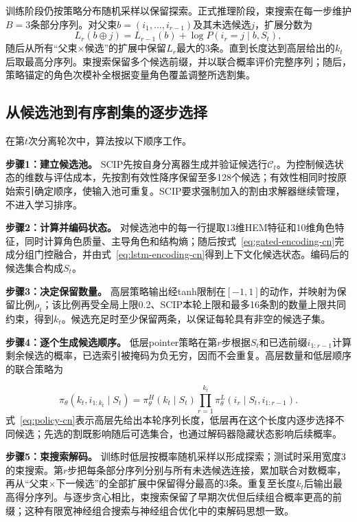 \documentclass[final,5p,times,twocolumn]{elsarticle}
\begin{document}
训练阶段仍按策略分布随机采样以保留探索。正式推理阶段，束搜索在每一步维护$B=3$条部分序列。对父束$b=(i_1,\ldots,i_{r-1})$及其未选候选$j$，扩展分数为
\begin{equation}
L_r(b\oplus j)=L_{r-1}(b)+\log P(i_r=j\mid b,S_t),
\label{eq:beam-score-cn}
\end{equation}
随后从所有“父束$\times$候选”的扩展中保留$L_r$最大的3条。直到长度达到高层给出的$k_t$后取最高分序列。束搜索保留多个候选前缀，并以联合概率评价完整序列；随后，策略锚定的角色次模补全根据变量角色覆盖调整所选割集。

\subsection{从候选池到有序割集的逐步选择}

在第$t$次分离轮次中，算法按以下顺序工作。

\noindent\textbf{步骤1：建立候选池。} SCIP先按自身分离器生成并验证候选行$\mathcal C_t$。为控制候选状态的维数与评估成本，先按割有效性降序保留至多128个候选；有效性相同时按原始索引确定顺序，使输入池可重复。SCIP要求强制加入的割由求解器继续管理，不进入学习排序。

\noindent\textbf{步骤2：计算并编码状态。} 对候选池中的每一行提取13维HEM特征和10维角色特征，同时计算角色质量、主导角色和结构熵；随后按式~\eqref{eq:gated-encoding-cn}完成分组门控融合，并由式~\eqref{eq:lstm-encoding-cn}得到上下文化候选状态。编码后的候选集合构成$S_t$。

\noindent\textbf{步骤3：决定保留数量。} 高层策略输出经tanh限制在$[-1,1]$的动作，并映射为保留比例$\rho_t$；该比例再受全局上限0.2、SCIP本轮上限和最多16条割的数量上限共同约束，得到$k_t$。候选充足时至少保留两条，以保证每轮具有非空的候选子集。

\noindent\textbf{步骤4：逐个生成候选顺序。} 低层pointer策略在第$r$步根据$S_t$和已选前缀$i_{1:r-1}$计算剩余候选的概率，已选索引被掩码为负无穷，因而不会重复。高层数量和低层顺序的联合策略为

\begin{equation}
\pi_\theta(k_t,i_{1:k_t}\mid S_t)=\pi_\theta^H(k_t\mid S_t)
\prod_{r=1}^{k_t}\pi_\theta^L(i_r\mid S_t,i_{1:r-1}).
\label{eq:policy-cn}
\end{equation}
式~\eqref{eq:policy-cn}表示高层先给出本轮序列长度，低层再在这个长度内逐步选择不同候选；先选的割既影响随后可选集合，也通过解码器隐藏状态影响后续概率。

\noindent\textbf{步骤5：束搜索解码。} 训练时低层按概率随机采样以形成探索；测试时采用宽度3的束搜索。第$r$步把每条部分序列分别与所有未选候选连接，累加联合对数概率，再从“父束$\times$下一候选”的全部扩展中保留得分最高的3条。重复至长度$k_t$后输出最高得分序列。与逐步贪心相比，束搜索保留了早期次优但后续组合概率更高的前缀；这种有限宽神经组合搜索与神经组合优化中的束解码思想一致\citep{choo2022beam}。
\end{document}
